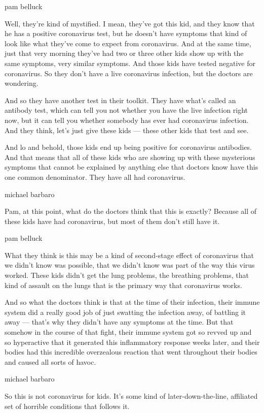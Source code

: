 pam belluck

Well, they're kind of mystified. I mean, they've got this kid, and they
know that he has a positive coronavirus test, but he doesn't have
symptoms that kind of look like what they've come to expect from
coronavirus. And at the same time, just that very morning they've had
two or three other kids show up with the same symptoms, very similar
symptoms. And those kids have tested negative for coronavirus. So they
don't have a live coronavirus infection, but the doctors are wondering.

And so they have another test in their toolkit. They have what's called
an antibody test, which can tell you not whether you have the live
infection right now, but it can tell you whether somebody has ever had
coronavirus infection. And they think, let's just give these kids ---
these other kids that test and see.

And lo and behold, those kids end up being positive for coronavirus
antibodies. And that means that all of these kids who are showing up
with these mysterious symptoms that cannot be explained by anything else
that doctors know have this one common denominator. They have all had
coronavirus.

michael barbaro

Pam, at this point, what do the doctors think that this is exactly?
Because all of these kids have had coronavirus, but most of them don't
still have it.

pam belluck

What they think is this may be a kind of second-stage effect of
coronavirus that we didn't know was possible, that we didn't know was
part of the way this virus worked. These kids didn't get the lung
problems, the breathing problems, that kind of assault on the lungs that
is the primary way that coronavirus works.

And so what the doctors think is that at the time of their infection,
their immune system did a really good job of just swatting the infection
away, of battling it away --- that's why they didn't have any symptoms
at the time. But that somehow in the course of that fight, their immune
system got so revved up and so hyperactive that it generated this
inflammatory response weeks later, and their bodies had this incredible
overzealous reaction that went throughout their bodies and caused all
sorts of havoc.

michael barbaro

So this is not coronavirus for kids. It's some kind of
later-down-the-line, affiliated set of horrible conditions that follows
it.

